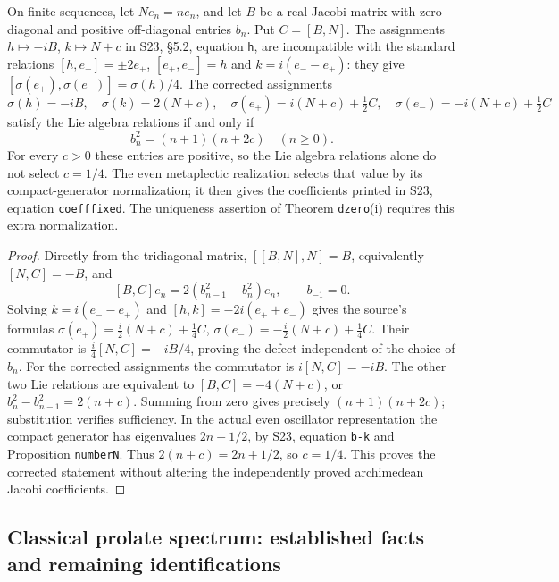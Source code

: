 \begin{proposition}
\label{AC-S11}
On finite sequences, let \(N e_n=ne_n\), and let \(B\) be a real
Jacobi matrix with zero diagonal and positive off-diagonal entries
\(b_n\).  Put \(C=[B,N]\).
The assignments \(h\mapsto-iB\), \(k\mapsto N+c\) in S23,
\S5.2, equation \texttt{h}, are incompatible with the standard
relations \([h,e_\pm]=\pm2e_\pm\), \([e_+,e_-]=h\) and
\(k=i(e_--e_+)\): they give
\([\sigma(e_+),\sigma(e_-)]=\sigma(h)/4\).
The corrected assignments
\[
 \sigma(h)=-iB,\quad \sigma(k)=2(N+c),\quad
 \sigma(e_+)=i(N+c)+\tfrac12C,\quad
 \sigma(e_-)=-i(N+c)+\tfrac12C
\]
satisfy the Lie algebra relations if and only if
\[
 b_n^2=(n+1)(n+2c)\quad(n\geq0).
\]
For every \(c>0\) these entries are positive, so the Lie algebra
relations alone do not select \(c=1/4\).  The even metaplectic
realization selects that value by its compact-generator normalization;
it then gives the coefficients printed in S23, equation
\texttt{coefffixed}.  The uniqueness assertion of Theorem
\texttt{dzero}(i) requires this extra normalization.
\end{proposition}
\begin{proof}
Directly from the tridiagonal matrix,
\([[B,N],N]=B\), equivalently \([N,C]=-B\), and
\[
 [B,C]e_n=2(b_{n-1}^2-b_n^2)e_n,\qquad b_{-1}=0.
\]
Solving \(k=i(e_--e_+)\) and
\([h,k]=-2i(e_++e_-)\) gives the source's formulas
\(\sigma(e_+)=\tfrac i2(N+c)+\tfrac14C\),
\(\sigma(e_-)=-\tfrac i2(N+c)+\tfrac14C\).
Their commutator is
\(\tfrac i4[N,C]=-iB/4\), proving the defect independent of the
choice of \(b_n\).
For the corrected assignments the commutator is \(i[N,C]=-iB\).
The other two Lie relations are equivalent to
\([B,C]=-4(N+c)\), or
\(b_n^2-b_{n-1}^2=2(n+c)\).  Summing from zero gives precisely
\((n+1)(n+2c)\); substitution verifies sufficiency.
In the actual even oscillator representation the compact generator
has eigenvalues \(2n+1/2\), by S23, equation \texttt{b-k} and
Proposition \texttt{numberN}.  Thus \(2(n+c)=2n+1/2\), so
\(c=1/4\).  This proves the corrected statement without altering
the independently proved archimedean Jacobi coefficients.
\end{proof}

\subsection{Classical prolate spectrum: established facts and remaining identifications}

